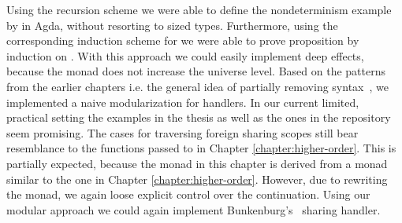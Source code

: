 Using the recursion scheme we were able to define the nondeterminism example by
\textcite{DBLP:conf/lics/PirogSWJ18} in Agda, without resorting to sized types.
Furthermore, using the corresponding induction scheme for  we
were able to prove proposition by induction on .
With this approach we could easily implement deep effects, because the
 monad does not increase the universe level.
Based on the patterns from the earlier chapters i.e. the general idea of
partially removing syntax~\cite{DBLP:conf/haskell/SchrijversPWJ19}, we
implemented a naive modularization for handlers.
In our current limited, practical setting the examples in the thesis as well as
the ones in the repository seem promising.
The cases for traversing foreign sharing scopes still bear resemblance to the
functions passed to  in Chapter \ref{chapter:higher-order}.
This is partially expected, because the monad in this chapter is derived from a
monad similar to the one in Chapter \ref{chapter:higher-order}.
However, due to rewriting the monad, we again loose explicit control over the
continuation.
Using our modular approach we could again implement
Bunkenburg's~\cite{bunkenburg2019modeling} sharing handler.
